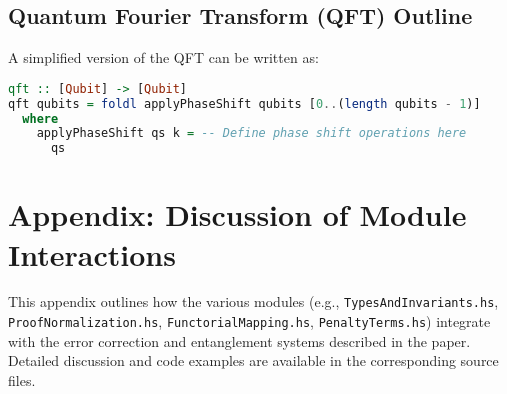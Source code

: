 \documentclass[12pt]{article}
\begin{document}
\subsection{Quantum Fourier Transform (QFT) Outline}
A simplified version of the QFT can be written as:
\begin{lstlisting}[language=Haskell]
qft :: [Qubit] -> [Qubit]
qft qubits = foldl applyPhaseShift qubits [0..(length qubits - 1)]
  where
    applyPhaseShift qs k = -- Define phase shift operations here
      qs
\end{lstlisting}

\section{Appendix: Discussion of Module Interactions}
This appendix outlines how the various modules (e.g., \texttt{TypesAndInvariants.hs}, \texttt{ProofNormalization.hs}, \texttt{FunctorialMapping.hs}, \texttt{PenaltyTerms.hs}) integrate with the error correction and entanglement systems described in the paper. Detailed discussion and code examples are available in the corresponding source files.
\end{document}
